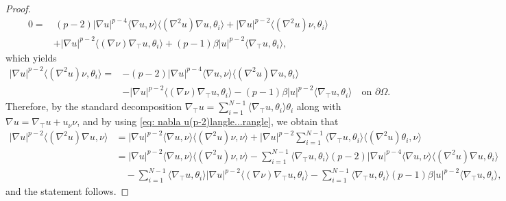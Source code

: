 \documentclass[10pt,a4paper, reqno]{amsart}
\numberwithin{equation}{section}
\begin{document}
\begin{proof}
    \begin{equation*}
        \begin{aligned}
        0= & \,(p-2)|\nabla u|^{p-4}\langle\nabla u,\nu\rangle\langle(\nabla^2u)\nabla u,\theta_i\rangle +|\nabla u|^{p-2}\langle(\nabla^2u)\nu,\theta_i\rangle
        \\&+|\nabla u|^{p-2}\langle(\nabla\nu)\nabla_\top u,\theta_i\rangle +(p-1)\beta |u|^{p-2}\langle\nabla_\top u,\theta_i\rangle,
        \end{aligned}
    \end{equation*}
    which yields
    \begin{equation}\label{eq: nabla u(p-2)langle...rangle}
        \begin{aligned}
        |\nabla u|^{p-2}\langle(\nabla^2u)\nu,\theta_i\rangle= & -(p-2)|\nabla u|^{p-4}\langle\nabla u,\nu\rangle\langle(\nabla^2u)\nabla u,\theta_i\rangle\\
        &-|\nabla u|^{p-2}\langle(\nabla\nu)\nabla_\top u,\theta_i\rangle -(p-1)\beta |u|^{p-2}\langle\nabla_\top u,\theta_i\rangle \quad \text{on } \partial\Omega.
        \end{aligned}
    \end{equation}
    Therefore, by the standard decomposition $\displaystyle \nabla_\top u = \sum_{i=1}^{N-1}\langle\nabla_\top u,\theta_i\rangle\theta_i$ along with $\nabla u = \nabla_\top u + u_\nu \nu$, and by using \eqref{eq: nabla u(p-2)langle...rangle}, we obtain that
    \begin{equation*}
        \begin{aligned}
        |\nabla u|^{p-2}\langle(\nabla^2u)\nabla u,\nu\rangle&=|\nabla u|^{p-2}\langle\nabla u,\nu\rangle\langle(\nabla^2u) \nu,\nu\rangle +|\nabla u|^{p-2}\sum_{i=1}^{N-1}\langle\nabla_\top u,\theta_i\rangle\langle(\nabla^2u)\theta_i,\nu\rangle\\
        &=|\nabla u|^{p-2}\langle\nabla u,\nu\rangle\langle(\nabla^2u)\nu,\nu\rangle
        -\sum_{i=1}^{N-1}\langle\nabla_\top u,\theta_i\rangle(p-2)|\nabla u|^{p-4}\langle\nabla u,\nu\rangle\langle(\nabla^2u)\nabla u,\theta_i\rangle\\
        & \quad -\sum_{i=1}^{N-1}\langle\nabla_\top u,\theta_i\rangle|\nabla u|^{p-2}\langle(\nabla\nu)\nabla_\top u,\theta_i\rangle
        -\sum_{i=1}^{N-1}\langle\nabla_\top u,\theta_i\rangle(p-1)\beta|u|^{p-2}\langle\nabla_\top u,\theta_i\rangle,
        \end{aligned}
    \end{equation*}
    and the statement follows.
\end{proof}
\end{document}
